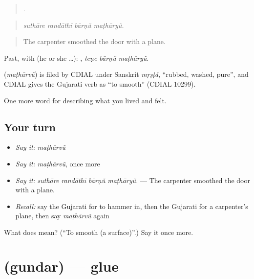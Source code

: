 \begin{quote}
   .
\end{quote}

\begin{quote}
\emph{suthāre randāthī bārṇũ maṭhāryũ.}
\end{quote}

\begin{quote}
The carpenter smoothed the door with a plane.
\end{quote}

Past, with  (he or she …):   , \emph{teṇe bārṇũ maṭhāryũ}.

\begin{cousinweb}
\textbf{} (\emph{maṭhārvũ}) is filed by CDIAL under Sanskrit \emph{mṛṣṭá}, \textquotedblleft{}rubbed, washed, pure\textquotedblright{}, and CDIAL gives the Gujarati verb as \textquotedblleft{}to smooth\textquotedblright{} (CDIAL 10299).
\end{cousinweb}

\begin{grammarlens}[title={What you've built}]
One more word for describing what you lived and felt.
\end{grammarlens}

\subsection*{Your turn}
\begin{itemize}
\raggedright
  \item \emph{Say it:} \emph{maṭhārvũ}
  \item \emph{Say it:} \emph{maṭhārvũ}, once more
  \item \emph{Say it:} \emph{suthāre randāthī bārṇũ maṭhāryũ.} — The carpenter smoothed the door with a plane.
  \item \emph{Recall:} say the Gujarati for to hammer in, then the Gujarati for a carpenter's plane, then say \emph{maṭhārvũ} again
\end{itemize}

\begin{tcolorbox}[breakable,colback=teal!4,colframe=teal!35!black,title={Before you move on}]
What does  mean? (\textquotedblleft{}To smooth (a surface)\textquotedblright{}.) Say it once more.
\end{tcolorbox}
\section[\texorpdfstring{\gu{ગુંદર} (gundar)}{ગુંદર (gundar)}]{ (gundar) — glue}

